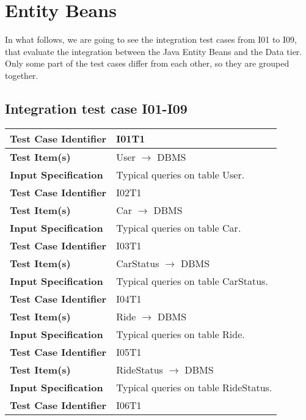 \section{Entity Beans}

In what follows, we are going to see the integration test cases from I01 to I09, that evaluate the integration between the Java Entity Beans and the Data tier.
Only some part of the test cases differ from each other, so they are grouped together.

\subsection{Integration test case I01-I09}

\begin{tabular}{l p{}}
    \hline
    \textbf{Test Case Identifier} & I01T1\\
    \hline
    \textbf{Test Item(s)} & User $\rightarrow$ DBMS \\
    \hline
    \textbf{Input Specification} & Typical queries on table User. \\
    \hline
    \hline
    \textbf{Test Case Identifier} & I02T1\\
    \hline
    \textbf{Test Item(s)} & Car $\rightarrow$ DBMS \\
    \hline
    \textbf{Input Specification} & Typical queries on table Car. \\
    \hline
    \hline
    \textbf{Test Case Identifier} & I03T1\\
    \hline
    \textbf{Test Item(s)} & CarStatus $\rightarrow$ DBMS \\
    \hline
    \textbf{Input Specification} & Typical queries on table CarStatus. \\
    \hline
    \hline
    \textbf{Test Case Identifier} & I04T1\\
    \hline
    \textbf{Test Item(s)} & Ride $\rightarrow$ DBMS \\
    \hline
    \textbf{Input Specification} & Typical queries on table Ride. \\
    \hline
    \hline
    \textbf{Test Case Identifier} & I05T1\\
    \hline
    \textbf{Test Item(s)} & RideStatus $\rightarrow$ DBMS \\
    \hline
    \textbf{Input Specification} & Typical queries on table RideStatus. \\
    \hline
    \hline
    \textbf{Test Case Identifier} & I06T1\\

\end{tabular}
